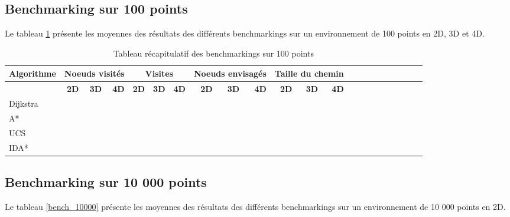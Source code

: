 \documentclass[pidr]{tnreport}
\begin{document}
		\subsection{Benchmarking sur 100 points}
		
		Le tableau \ref{bench_100} présente les moyennes des résultats des différents benchmarkings sur un environnement de 100 points en 2D, 3D et 4D.
		
\begin{table}[H]
\begin{center}
   \begin{tabular}{| l || r | r | r || r | r | r || r | r | r || r | r | r || r | r | r || r | r | r || r | r | r |}
     \hline
      \textbf{Algorithme} & \multicolumn{3}{c||}{\textbf{Noeuds visités}} & \multicolumn{3}{c||}{\textbf{Visites}} & \multicolumn{3}{c||}{\textbf{Noeuds envisagés}} & \multicolumn{3}{c||}{\textbf{Taille du chemin}} \\
     \hline
     \cline{2-5}
    & \textbf{2D} & \textbf{3D} & \textbf{4D} & \textbf{2D} & \textbf{3D} & \textbf{4D} & \textbf{2D} & \textbf{3D} & \textbf{4D} & \textbf{2D} & \textbf{3D} & \textbf{4D}\\ \hline
     Dijkstra &  &  &  &  &  &  & & &  & & & \\ \hline
     A* &  &  &  &  &  &  &  &  &  &  &  &   \\ \hline
      UCS &  &  &  &  &  &  &  &  &  &  &  &   \\ \hline
      IDA* &  &  &  &  &  &  & & &  & & &   \\ \hline
   \end{tabular}
 \end{center}
 \caption{Tableau récapitulatif des benchmarkings sur 100 points \label{bench_100}}
\end{table}		

\subsection{Benchmarking sur 10 000 points}

Le tableau \ref{bench_10000} présente les moyennes des résultats des différents benchmarkings sur un environnement de 10 000 points en 2D.		
		
\end{document}
